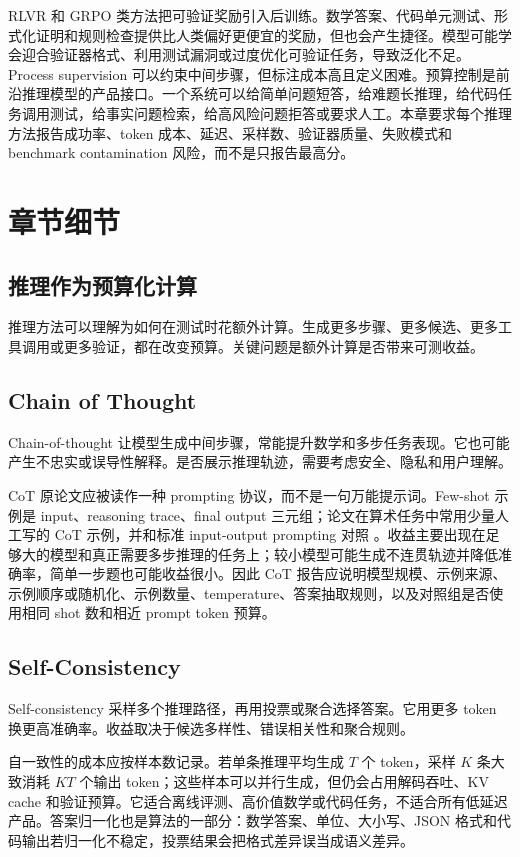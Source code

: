 \documentclass[UTF8,zihao=-4,openany]{ctexbook}
\begin{document}
RLVR 和 GRPO 类方法把可验证奖励引入后训练。数学答案、代码单元测试、形式化证明和规则检查提供比人类偏好更便宜的奖励，但也会产生捷径。模型可能学会迎合验证器格式、利用测试漏洞或过度优化可验证任务，导致泛化不足。Process supervision 可以约束中间步骤，但标注成本高且定义困难。预算控制是前沿推理模型的产品接口。一个系统可以给简单问题短答，给难题长推理，给代码任务调用测试，给事实问题检索，给高风险问题拒答或要求人工。本章要求每个推理方法报告成功率、token 成本、延迟、采样数、验证器质量、失败模式和 benchmark contamination 风险，而不是只报告最高分。

\section{章节细节}
\subsection{推理作为预算化计算}
推理方法可以理解为如何在测试时花额外计算。生成更多步骤、更多候选、更多工具调用或更多验证，都在改变预算。关键问题是额外计算是否带来可测收益。

\subsection{Chain of Thought}
Chain-of-thought 让模型生成中间步骤，常能提升数学和多步任务表现。它也可能产生不忠实或误导性解释。是否展示推理轨迹，需要考虑安全、隐私和用户理解。

CoT 原论文应被读作一种 prompting 协议，而不是一句万能提示词。Few-shot 示例是 input、reasoning trace、final output 三元组；论文在算术任务中常用少量人工写的 CoT 示例，并和标准 input-output prompting 对照 \cite{wei2022chain}。收益主要出现在足够大的模型和真正需要多步推理的任务上；较小模型可能生成不连贯轨迹并降低准确率，简单一步题也可能收益很小。因此 CoT 报告应说明模型规模、示例来源、示例顺序或随机化、示例数量、temperature、答案抽取规则，以及对照组是否使用相同 shot 数和相近 prompt token 预算。

\subsection{Self-Consistency}
Self-consistency 采样多个推理路径，再用投票或聚合选择答案。它用更多 token 换更高准确率。收益取决于候选多样性、错误相关性和聚合规则。

自一致性的成本应按样本数记录。若单条推理平均生成 $T$ 个 token，采样 $K$ 条大致消耗 $KT$ 个输出 token；这些样本可以并行生成，但仍会占用解码吞吐、KV cache 和验证预算。它适合离线评测、高价值数学或代码任务，不适合所有低延迟产品。答案归一化也是算法的一部分：数学答案、单位、大小写、JSON 格式和代码输出若归一化不稳定，投票结果会把格式差异误当成语义差异。
\end{document}
